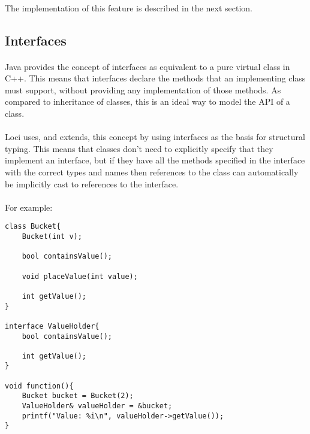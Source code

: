 \documentclass[12pt,twoside,notitlepage]{report}
\begin{document}
\paragraph{}
The implementation of this feature is described in the next section.

\subsection{Interfaces}

\paragraph{}
Java provides the concept of interfaces as equivalent to a pure virtual class in C++. This means that interfaces declare the methods that an implementing class must support, without providing any implementation of those methods. As compared to inheritance of classes, this is an ideal way to model the API of a class.

\paragraph{}
Loci uses, and extends, this concept by using interfaces as the basis for structural typing. This means that classes don't need to explicitly specify that they implement an interface, but if they have all the methods specified in the interface with the correct types and names then references to the class can automatically be implicitly cast to references to the interface.

\paragraph{}
For example:

\small{
\begin{verbatim}
class Bucket{
    Bucket(int v);

    bool containsValue();
    
    void placeValue(int value);
    
    int getValue();
}

interface ValueHolder{
    bool containsValue();
    
    int getValue();
}

void function(){
    Bucket bucket = Bucket(2);
    ValueHolder& valueHolder = &bucket;
    printf("Value: %i\n", valueHolder->getValue());
}
\end{verbatim}
}
\end{document}
